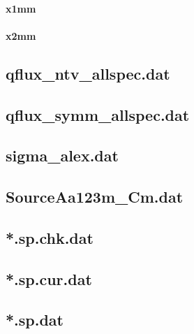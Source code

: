 \paragraph{x1mm}

\paragraph{x2mm}

\subsection{qflux\_ntv\_allspec.dat}

\subsection{qflux\_symm\_allspec.dat}

\subsection{sigma\_alex.dat}

\subsection{SourceAa123m\_Cm.dat}

\subsection{*.sp.chk.dat}

\subsection{*.sp.cur.dat}

\subsection{*.sp.dat}

